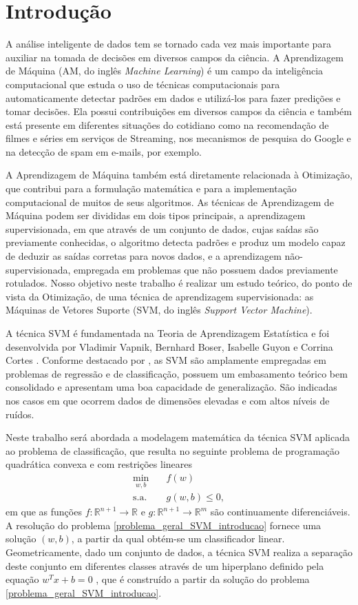 \documentclass[12pt,a4paper]{scrartcl}
\def\RR{\mathds{R}}
\theoremstyle{definition}%
\begin{document}
\section{Introdução}

A análise inteligente de dados tem se tornado cada vez mais importante para auxiliar na tomada de decisões em diversos campos da ciência. A Aprendizagem de Máquina (AM, do inglês \textit{Machine Learning}) é um campo da inteligência computacional que estuda o uso de técnicas computacionais para automaticamente detectar padrões em dados e utilizá-los para fazer predições e tomar decisões. Ela possui contribuições em diversos campos da ciência e também está presente em diferentes situações do cotidiano como na recomendação de filmes e séries em serviços de Streaming, nos mecanismos de pesquisa do Google e na detecção de spam em e-mails, por exemplo. 

A Aprendizagem de Máquina também está diretamente relacionada à Otimização, que contribui para a formulação matemática e para a implementação computacional de muitos de seus algoritmos. As técnicas de Aprendizagem de Máquina podem ser divididas em dois tipos principais, a aprendizagem supervisionada, em que através de um conjunto de dados, cujas saídas são previamente conhecidas, o algoritmo detecta padrões e produz um modelo capaz de deduzir as saídas corretas para novos dados, e a aprendizagem não-supervisionada, empregada em problemas que não possuem dados previamente rotulados. Nosso objetivo neste trabalho é realizar um estudo teórico, do ponto de vista da Otimização, de uma técnica de aprendizagem supervisionada: as Máquinas de Vetores Suporte (SVM, do inglês \textit{Support Vector Machine}).

A técnica SVM é fundamentada na Teoria de Aprendizagem Estatística e foi desenvolvida por Vladimir Vapnik, Bernhard Boser, Isabelle Guyon e Corrina Cortes \cite{Vladimir1992,Vladimir1995}. Conforme destacado por \textcite{Evelin2017}, as SVM são amplamente empregadas em problemas de regressão e de classificação, possuem um embasamento teórico bem consolidado e apresentam uma boa capacidade de generalização. São indicadas nos casos em que ocorrem dados de dimensões elevadas e com altos níveis de ruídos. 

Neste trabalho será abordada a modelagem matemática da técnica SVM aplicada ao problema de classificação, que resulta no seguinte problema de programação quadrática convexa e com restrições lineares
\[ \label{problema_geral_SVM_introducao}
\begin{aligned}
\min_{w,b} & \quad f(w) \\
\text{s.a.} &  \quad g(w,b) \leq 0, \end{aligned}
\]
em que as funções $f:\RR^{n+1} \rightarrow \RR$ e $g:\RR^{n+1} \rightarrow \RR^{m}$ são continuamente diferenciáveis. A resolução do problema \eqref{problema_geral_SVM_introducao} fornece uma solução $(w,b)$, a partir da qual obtém-se um classificador linear. Geometricamente, dado um conjunto de dados, a técnica SVM realiza a separação deste conjunto em diferentes classes através de um hiperplano definido pela equação $w^{T}x + b = 0$ \cite{Evelin2017}, que é construído a partir da solução do problema \eqref{problema_geral_SVM_introducao}.
\end{document}
